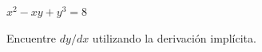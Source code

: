 \setcounter{enumi}{6}
\item $x^2 - xy + y^3 = 8$
\par
Encuentre $dy/dx$ utilizando la derivación implícita.
